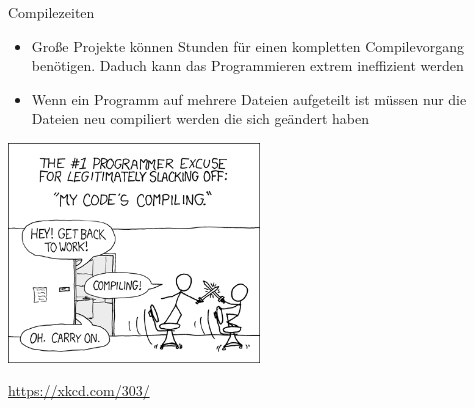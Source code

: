 \documentclass[presentation]{beamer}
\begin{document}
\begin{frame}[label={sec:org2421e86}]{Compilezeiten}
\begin{itemize}
\item Große Projekte können \alert{Stunden} für einen kompletten Compilevorgang
benötigen. Daduch kann das Programmieren extrem ineffizient werden
\item Wenn ein Programm auf mehrere Dateien aufgeteilt ist müssen nur die
Dateien neu compiliert werden die sich \alert{geändert} haben
\end{itemize}
\begin{center}\begin{center}
\includegraphics[width=0.5\textwidth]{img/compiling.png}
\end{center}\end{center}
\tiny \center
\url{https://xkcd.com/303/}
\end{frame}
\end{document}
